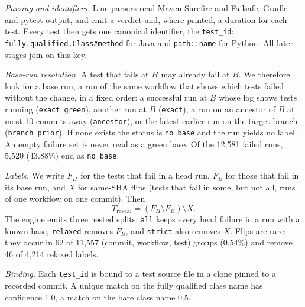 \documentclass[10pt,conference]{IEEEtran}
\begin{document}
\textit{Parsing and identifiers.} Line parsers read Maven Surefire and Failsafe, Gradle and pytest output, and emit a verdict and, where printed, a duration for each test. Every test then gets one canonical identifier, the \texttt{test\_id}: \texttt{fully.qualified.Class\#method} for Java and \texttt{path::name} for Python. All later stages join on this key.

\textit{Base-run resolution.} A test that fails at $H$ may already fail at $B$. We therefore look for a base run, a run of the same workflow that shows which tests failed without the change, in a fixed order: a successful run at $B$ whose log shows tests running (\texttt{exact\_green}), another run at $B$ (\texttt{exact}), a run on an ancestor of $B$ at most 10 commits away (\texttt{ancestor}), or the latest earlier run on the target branch (\texttt{branch\_prior}). If none exists the status is \texttt{no\_base} and the run yields no label. An empty failure set is never read as a green base. Of the 12,581 failed runs, 5,520 (43.88\%) end as \texttt{no\_base}.

\textit{Labels.} We write $F_H$ for the tests that fail in a head run, $F_B$ for those that fail in its base run, and $X$ for same-SHA flips (tests that fail in some, but not all, runs of one workflow on one commit). Then
\begin{equation}
T_{\text{reveal}} = (F_H \setminus F_B) \setminus X .
\label{eq:reveal}
\end{equation}
The engine emits three nested splits: \texttt{all} keeps every head failure in a run with a known base, \texttt{relaxed} removes $F_B$, and \texttt{strict} also removes $X$. Flips are rare; they occur in 62 of 11,557 (commit, workflow, test) groups (0.54\%) and remove 46 of 4,214 relaxed labels.

\textit{Binding.} Each \texttt{test\_id} is bound to a test source file in a clone pinned to a recorded commit. A unique match on the fully qualified class name has confidence 1.0, a match on the bare class name 0.5.
\end{document}
